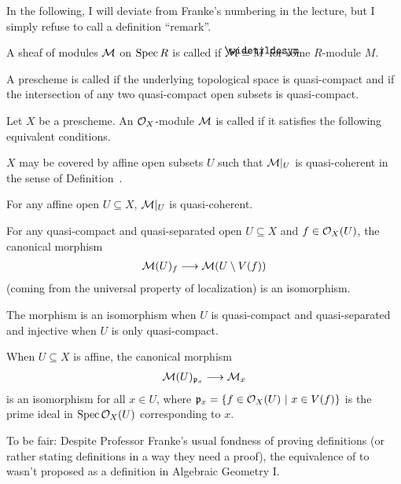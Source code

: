 \documentclass[a4paper,parskip=half,numbers=enddot, DIV=12]{scrreprt}
\begin{document}
	In the following, I will deviate from Franke's numbering in the lecture, but I simply refuse to call a definition ``remark''.
\begin{defi}
	A sheaf of modules $\mathcal{M}$ on $\operatorname{Spec} R$ is called  if $\Mm\simeq \snake{M}$ for some $R$-module $M$.
\end{defi}
\begin{defi}
	A prescheme is called  if the underlying topological space is quasi-compact and  if the intersection of any two quasi-compact open subsets is quasi-compact.
\end{defi}

\begin{defi}
	Let $X$ be a prescheme. An $\mathcal{O}_X$-module $\mathcal{M}$ is called  if it satisfies the following equivalent conditions.
	\begin{alphanumerate}
		\item $X$ may be covered by affine open subsets $U$ such that $\mathcal{M}|_U$ is quasi-coherent in the sense of Definition~.
		\item For any affine open $U\subseteq X$, $\mathcal{M}|_U$ is quasi-coherent.
		\item For any quasi-compact and quasi-separated open $U\subseteq X$ and $f\in\mathcal{O}_X(U)$, the canonical morphism
		\begin{align}\lbl{eq:qcIso}
		\Mm(U)_f\morphism\Mm(U\setminus V(f))
		\end{align}
		(coming from the universal property of localization) is an isomorphism.
		\item The morphism  is an isomorphism when $U$ is quasi-compact and quasi-separated and injective when $U$ is only quasi-compact.
		\item When $U\subseteq X$ is affine, the canonical morphism
		\begin{align}\lbl{eq:qcIso2}
		\Mm(U)_{\pp_x}\morphism\Mm_x
		\end{align}
		is an isomorphism for all $x\in U$, where $\mathfrak{p}_x=\left\{f\in\mathcal{O}_X(U)\ \middle|\  x\in V(f)\right\}$ is the prime ideal in $\operatorname{Spec} \mathcal{O}_X(U)$ corresponding to $x$.
	\end{alphanumerate}
\end{defi}
\begin{rem*}
	To be fair: Despite Professor Franke's usual fondness of proving definitions (or rather stating definitions in a way they need a proof), the equivalence of  to  wasn't proposed as a definition in Algebraic Geometry I. 
\end{rem*}
\end{document}
